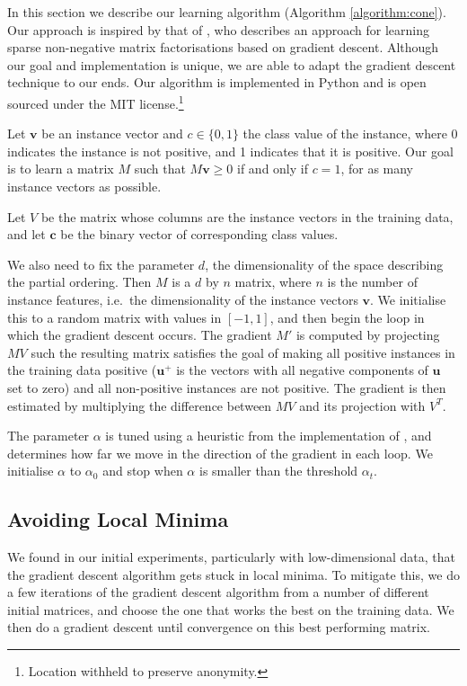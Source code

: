 In this section we describe our learning algorithm (Algorithm
\ref{algorithm:cone}). Our approach is inspired by that of
, who describes an approach for learning sparse
non-negative matrix factorisations based on gradient descent. Although
our goal and implementation is unique, we are able to adapt the
gradient descent technique to our ends. Our algorithm is implemented
in Python and is open sourced under the MIT license.\footnote{Location
  withheld to preserve anonymity.}

Let $\mathbf{v}$ be an instance vector and $c \in \{0,1\}$ the class value of
the instance, where 0 indicates the instance is not positive, and 1
indicates that it is positive. Our goal is to learn a matrix $M$ such
that $M\mathbf{v} \ge 0$ if and only if $c = 1$, for as many instance vectors
as possible.

Let $V$ be the matrix whose columns are the instance vectors in the
training data, and let $\mathbf{c}$ be the binary vector of
corresponding class values.

We also need to fix the parameter $d$, the dimensionality of the space
describing the partial ordering. Then $M$ is a $d$ by $n$ matrix,
where $n$ is the number of instance features, i.e.~the dimensionality
of the instance vectors $\mathbf{v}$. We initialise this to a random
matrix with values in $[-1,1]$, and then begin the loop in which the
gradient descent occurs. The gradient $M'$ is computed by projecting
$MV$ such the resulting matrix satisfies the goal of making all
positive instances in the training data positive ($\mathbf{u}^+$ is
the vectors with all negative components of $\mathbf{u}$ set to zero)
and all non-positive instances are not positive. The gradient is then
estimated by multiplying the difference between $MV$ and its
projection with $V^T$.

The parameter $\alpha$ is tuned using a heuristic from the
implementation of , and determines how far we move
in the direction of the gradient in each loop. We initialise $\alpha$
to $\alpha_0$ and stop when $\alpha$ is smaller than the threshold
$\alpha_t$.

\subsection{Avoiding Local Minima}

We found in our initial experiments, particularly with low-dimensional
data, that the gradient descent algorithm gets stuck in local
minima. To mitigate this, we do a few iterations of the gradient
descent algorithm from a number of different initial matrices, and
choose the one that works the best on the training data. We then do a
gradient descent until convergence on this best performing matrix.

